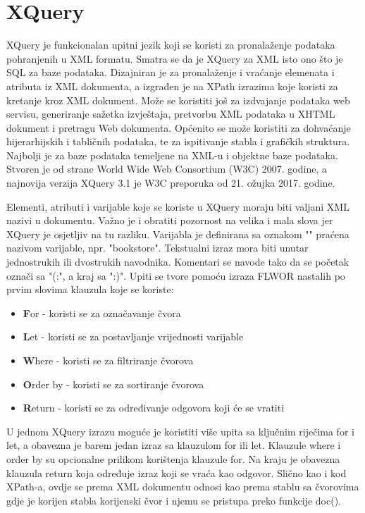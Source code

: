 \documentclass{foi}
\begin{document}
\section{XQuery}

XQuery je funkcionalan upitni jezik koji se koristi za pronalaženje podataka pohranjenih u XML formatu. Smatra se da je XQuery za XML isto ono što je SQL za baze podataka. Dizajniran je za pronalaženje i vraćanje elemenata i atributa iz XML dokumenta, a izgrađen je na XPath izrazima koje koristi za kretanje kroz XML dokument. Može se koristiti još za izdvajanje podataka web servisu, generiranje sažetka izvještaja, pretvorbu XML podataka u XHTML dokument i pretragu Web dokumenta. Općenito se može koristiti za dohvaćanje hijerarhijskih i tabličnih podataka, te za ispitivanje stabla i grafičkih struktura. Najbolji je za baze podataka temeljene na XML-u i objektne baze podataka. Stvoren je od strane World Wide Web Consortium (W3C) 2007. godine, a najnovija verzija XQuery 3.1 je W3C preporuka od 21. ožujka 2017. godine.

Elementi, atributi i varijable koje se koriste u XQuery moraju biti valjani XML nazivi u dokumentu. Važno je i obratiti pozornost na velika i mala slova jer XQuery je osjetljiv na tu razliku. Varijabla je definirana sa oznakom "\textdollar " praćena nazivom varijable, npr. "\textdollar bookstore". Tekstualni izraz mora biti unutar jednostrukih ili dvostrukih navodnika. Komentari se navode tako da se početak označi sa "(:", a kraj sa ":)". Upiti se tvore pomoću izraza FLWOR nastalih po prvim slovima klauzula koje se koriste:

\begin{itemize}
\item \textbf{F}or - koristi se za označavanje čvora
\item \textbf{L}et - koristi se za postavljanje vrijednosti varijable
\item \textbf{W}here - koristi se za filtriranje čvorova
\item \textbf{O}rder by - koristi se za sortiranje čvorova
\item \textbf{R}eturn - koristi se za određivanje odgovora koji će se vratiti
\end{itemize}

U jednom XQuery izrazu moguće je koristiti više upita sa ključnim riječima for i let, a obavezna je barem jedan izraz sa klauzulom for ili let. Klauzule where i order by su opcionalne prilikom korištenja klauzule for. Na kraju je obavezna klauzula return koja određuje izraz koji se vraća kao odgovor. Slično kao i kod XPath-a, ovdje se prema XML dokumentu odnosi kao prema stablu sa čvorovima gdje je korijen stabla korijenski čvor i njemu se pristupa preko funkcije doc().
\end{document}

